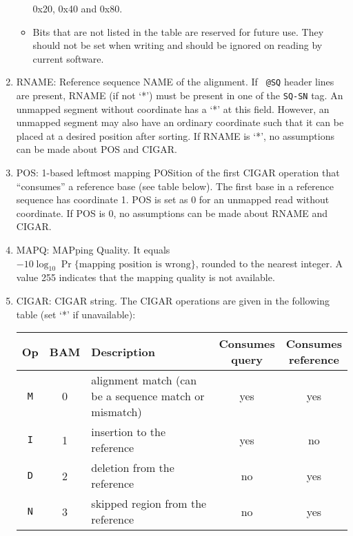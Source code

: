 \begin{enumerate}
\begin{itemize}
        0x20, 0x40 and 0x80.
      \item Bits that are not listed in the table are reserved for future use.
        They should not be set when writing and should be ignored on reading
        by current software.
      \end{itemize}
    \item {\sf RNAME}: Reference sequence NAME of the alignment. If {\tt
        @SQ} header lines are present, {\sf RNAME} (if not `*') must be
      present in one of the {\tt SQ-SN} tag. An unmapped segment without
      coordinate has a `*' at this field. However, an unmapped segment may
      also have an ordinary coordinate such that it can be placed at a
      desired position after sorting. If {\sf RNAME} is `*', no assumptions
      can be made about {\sf POS} and {\sf CIGAR}.
    \item {\sf POS}: 1-based leftmost mapping POSition of the first {\sf
        CIGAR} operation that ``consumes'' a reference base (see table below).
        The first base in a reference sequence has coordinate 1. {\sf
        POS} is set as 0 for an unmapped read without coordinate. If {\sf
        POS} is 0, no assumptions can be made about {\sf RNAME} and {\sf
        CIGAR}.
    \item {\sf MAPQ}: MAPping Quality. It equals
      $-10\log_{10}\Pr\{\mbox{mapping position is wrong}\}$, rounded to the
      nearest integer. A value 255 indicates that the mapping quality is not
      available.
    \item {\sf CIGAR}: CIGAR string. The CIGAR operations are given in the
      following table (set `*' if unavailable):
      \begin{center}
      \begin{tabular}{ccp{5cm}cc}
      \toprule
      Op & BAM & Description & \makecell{Consumes \\ query} & \makecell{Consumes \\ reference}\\
      \midrule
      {\tt M} & 0 & alignment match (can be a sequence match or mismatch) & yes & yes \\
      {\tt I} & 1 & insertion to the reference                                  & yes & no  \\
      {\tt D} & 2 & deletion from the reference                                 & no  & yes \\
      {\tt N} & 3 & skipped region from the reference                           & no  & yes \\

\end{tabular}
\end{center}
\end{enumerate}
